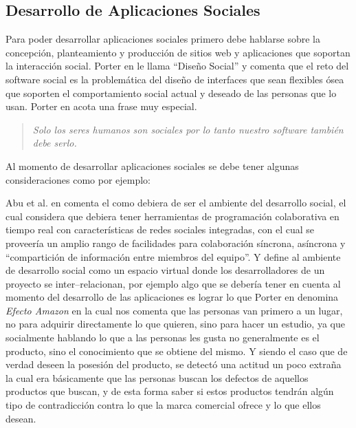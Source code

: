 \documentclass[oneside,12pt,a4paper]{memoir}%
\begin{document}
		\subsection{Desarrollo de Aplicaciones Sociales}
		\label{sec:DevelopingSA}
		Para poder desarrollar aplicaciones sociales primero debe hablarse
		sobre la concepci\'on, planteamiento y producci\'on de sitios web y aplicaciones
		que soportan la interacci\'on social. Porter en \cite{Porter2008} le llama
		``Dise\~no Social'' y comenta que el reto del software social es la
		problem\'atica del dise\~no de interfaces que sean flexibles \'osea que
		soporten el comportamiento social actual y deseado de las personas que lo
		usan. Porter en \cite{Porter2008} acota una frase muy especial.
		
		\begin{quotation}
		\textit{Solo los seres humanos son sociales por lo tanto nuestro software
		tambi\'en debe serlo.}
		\end{quotation}
		
		Al momento de desarrollar aplicaciones sociales se debe tener algunas
		consideraciones como por ejemplo:
		
		Abu et al. en \cite{Bani2011} comenta el como debiera de ser el ambiente del
		desarrollo social, el cual considera que debiera tener herramientas de programaci\'on
		colaborativa en tiempo real con caracter\'isticas de redes sociales integradas,
		con el cual se proveer\'ia un amplio rango  de facilidades para colaboraci\'on
		s\'incrona, as\'incrona y ``compartici\'on de informaci\'on entre miembros del
		equipo''. Y define al ambiente de desarrollo social como un espacio virtual
		donde los desarrolladores de un proyecto se inter--relacionan, por ejemplo
		algo que se deber\'ia tener en cuenta al momento del desarrollo de las
		aplicaciones es lograr lo que Porter en \cite{Porter2008} denomina
		\textit{Efecto Amazon} en la cual nos comenta que las personas van primero a
		un lugar, no para adquirir directamente lo que quieren, sino para hacer un
		estudio, ya que socialmente hablando lo que a las personas les gusta no
		generalmente es el producto, sino el conocimiento que se obtiene del mismo. Y
		siendo el caso que de verdad deseen la posesi\'on del producto, se detect\'o
		una actitud un poco extra\~na la cual era b\'asicamente que las personas
		buscan los defectos de aquellos productos que buscan, y de esta forma saber si
		estos productos tendr\'an alg\'un tipo de contradicci\'on contra lo que la
		marca comercial ofrece y lo que ellos desean.
		
\end{document}
